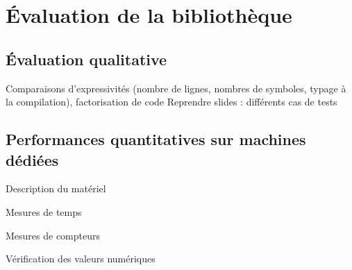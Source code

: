 
\chapter{\'Evaluation de la bibliothèque}


\section{\'Evaluation qualitative}

Comparaisons d'expressivités (nombre de lignes, nombres de symboles, typage à la compilation), factorisation de code
Reprendre slides : différents cas de tests


\section{Performances quantitatives sur machines dédiées}

Description du matériel

Mesures de temps

Mesures de compteurs

Vérification des valeurs numériques
